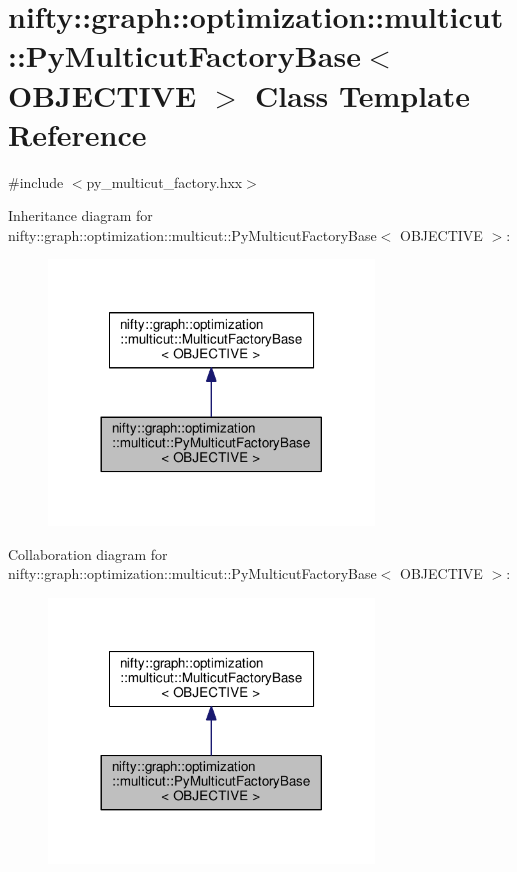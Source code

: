 \hypertarget{classnifty_1_1graph_1_1optimization_1_1multicut_1_1PyMulticutFactoryBase}{}\section{nifty\+:\+:graph\+:\+:optimization\+:\+:multicut\+:\+:Py\+Multicut\+Factory\+Base$<$ O\+B\+J\+E\+C\+T\+I\+V\+E $>$ Class Template Reference}
\label{classnifty_1_1graph_1_1optimization_1_1multicut_1_1PyMulticutFactoryBase}


{\ttfamily \#include $<$py\+\_\+multicut\+\_\+factory.\+hxx$>$}



Inheritance diagram for nifty\+:\+:graph\+:\+:optimization\+:\+:multicut\+:\+:Py\+Multicut\+Factory\+Base$<$ O\+B\+J\+E\+C\+T\+I\+V\+E $>$\+:\nopagebreak
\begin{figure}[H]
\begin{center}
\leavevmode
\includegraphics[width=245pt]{classnifty_1_1graph_1_1optimization_1_1multicut_1_1PyMulticutFactoryBase__inherit__graph}
\end{center}
\end{figure}


Collaboration diagram for nifty\+:\+:graph\+:\+:optimization\+:\+:multicut\+:\+:Py\+Multicut\+Factory\+Base$<$ O\+B\+J\+E\+C\+T\+I\+V\+E $>$\+:\nopagebreak
\begin{figure}[H]
\begin{center}
\leavevmode
\includegraphics[width=245pt]{classnifty_1_1graph_1_1optimization_1_1multicut_1_1PyMulticutFactoryBase__coll__graph}
\end{center}
\end{figure}
